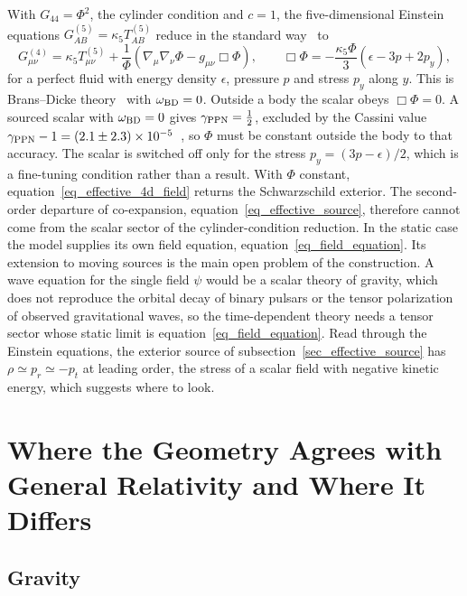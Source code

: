 \documentclass{iopjournal}
\begin{document}
With $G_{44}=\Phi^2$, the cylinder condition and $c=1$, the five-dimensional Einstein equations $G^{(5)}_{AB}=\kappa_5T^{(5)}_{AB}$ reduce in the standard way~\cite{OverduinWesson1997} to
\begin{equation}\label{eq_effective_4d_field}
    G^{(4)}_{\mu\nu}=\kappa_5T^{(5)}_{\mu\nu}+\frac{1}{\Phi}\left(\nabla_\mu\nabla_\nu\Phi-g_{\mu\nu}\Box\Phi\right),
    \qquad
    \Box\Phi=-\frac{\kappa_5\Phi}{3}\left(\epsilon-3p+2p_y\right),
\end{equation}
for a perfect fluid with energy density $\epsilon$, pressure $p$ and stress $p_y$ along $y$. This is Brans--Dicke theory~\cite{BransDicke1961} with $\omega_{\rm BD}=0$. Outside a body the scalar obeys $\Box\Phi=0$. A sourced scalar with $\omega_{\rm BD}=0$ gives $\gamma_{\rm PPN}=\tfrac12$, excluded by the Cassini value $\gamma_{\rm PPN}-1=(2.1\pm2.3)\times10^{-5}$~\cite{Bertotti2003}, so $\Phi$ must be constant outside the body to that accuracy. The scalar is switched off only for the stress $p_y=(3p-\epsilon)/2$, which is a fine-tuning condition rather than a result. With $\Phi$ constant, equation~\eqref{eq_effective_4d_field} returns the Schwarzschild exterior. The second-order departure of co-expansion, equation~\eqref{eq_effective_source}, therefore cannot come from the scalar sector of the cylinder-condition reduction. In the static case the model supplies its own field equation, equation~\eqref{eq_field_equation}. Its extension to moving sources is the main open problem of the construction. A wave equation for the single field $\psi$ would be a scalar theory of gravity, which does not reproduce the orbital decay of binary pulsars or the tensor polarization of observed gravitational waves, so the time-dependent theory needs a tensor sector whose static limit is equation~\eqref{eq_field_equation}. Read through the Einstein equations, the exterior source of subsection~\ref{sec_effective_source} has $\rho\simeq p_r\simeq-p_t$ at leading order, the stress of a scalar field with negative kinetic energy, which suggests where to look.
\section{Where the Geometry Agrees with General Relativity and Where It Differs}\label{sec_gamma_coscaling}

\subsection{Gravity}
\end{document}
